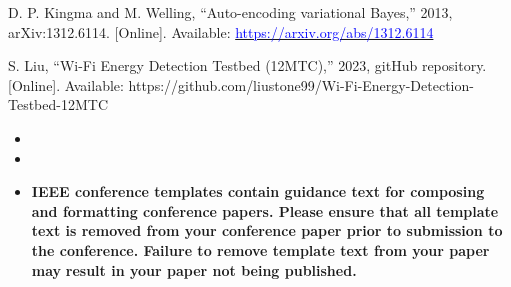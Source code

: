 \documentclass[preprint,12pt,authoryear]{elsarticle}
\begin{document}
D. P. Kingma and M. Welling, “Auto-encoding variational Bayes,” 2013, arXiv:1312.6114. [Online]. Available: \href{https://arxiv.org/abs/1312.6114}{\textcolor{blue}{https://arxiv.org/abs/1312.6114}}

S. Liu, “Wi-Fi Energy Detection Testbed (12MTC),” 2023, gitHub repository. [Online]. Available: https://github.com/liustone99/Wi-Fi-Energy-Detection-Testbed-12MTC 

\begin{itemize}
\item 
\item 
\item \textcolor[rgb]{1.000,0.000,0.000}{\textbf{IEEE conference templates contain guidance text for composing and formatting conference papers. Please ensure that all template text is removed from your conference paper prior to submission to the conference. Failure to remove template text from your paper }}\textcolor[rgb]{1.000,0.000,0.000}{\textbf{may}}\textcolor[rgb]{1.000,0.000,0.000}{\textbf{ result in your paper not being published.}}
\end{itemize}
\end{document}
